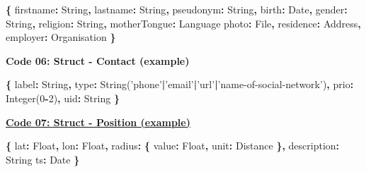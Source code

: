 \documentclass[12pt,english,a4paper,titlepage,cleardoublepage=empty,dottedtoc]{report}
\newenvironment{Shaded}{\begin{snugshade}}{\end{snugshade}}
\newcommand{\DataTypeTok}[1]{\textcolor[rgb]{0.13,0.29,0.53}{#1}}
\newcommand{\DecValTok}[1]{\textcolor[rgb]{0.00,0.00,0.81}{#1}}
\newcommand{\StringTok}[1]{\textcolor[rgb]{0.31,0.60,0.02}{#1}}
\newcommand{\OperatorTok}[1]{\textcolor[rgb]{0.81,0.36,0.00}{\textbf{#1}}}
\newcommand{\AttributeTok}[1]{\textcolor[rgb]{0.77,0.63,0.00}{#1}}
\newcommand{\NormalTok}[1]{#1}
\begin{document}
\begin{Shaded}
\begin{Highlighting}[numbers=left,,]
\OperatorTok{\{}
    \DataTypeTok{firstname}\OperatorTok{:}\NormalTok{ String}\OperatorTok{,}
    \DataTypeTok{lastname}\OperatorTok{:}\NormalTok{ String}\OperatorTok{,}
    \DataTypeTok{pseudonym}\OperatorTok{:}\NormalTok{ String}\OperatorTok{,}
    \DataTypeTok{birth}\OperatorTok{:}\NormalTok{ Date}\OperatorTok{,}
    \DataTypeTok{gender}\OperatorTok{:}\NormalTok{ String}\OperatorTok{,}
    \DataTypeTok{religion}\OperatorTok{:}\NormalTok{ String}\OperatorTok{,}
    \DataTypeTok{motherTongue}\OperatorTok{:}\NormalTok{ Language}
    \DataTypeTok{photo}\OperatorTok{:}\NormalTok{ File}\OperatorTok{,}
    \DataTypeTok{residence}\OperatorTok{:}\NormalTok{ Address}\OperatorTok{,}
    \DataTypeTok{employer}\OperatorTok{:}\NormalTok{ Organisation}
\OperatorTok{\}}
\end{Highlighting}
\end{Shaded}

\textbf{\protect\hypertarget{code-06_struct_contact}{}{Code 06: Struct -
Contact (example)}}

\begin{Shaded}
\begin{Highlighting}[numbers=left,,]
\OperatorTok{\{}
    \DataTypeTok{label}\OperatorTok{:}\NormalTok{ String}\OperatorTok{,}
    \DataTypeTok{type}\OperatorTok{:} \AttributeTok{String}\NormalTok{(}\StringTok{'phone'}\OperatorTok{|}\StringTok{'email'}\OperatorTok{|}\StringTok{'url'}\OperatorTok{|}\StringTok{'name-of-social-network'}\NormalTok{)}\OperatorTok{,}
    \DataTypeTok{prio}\OperatorTok{:} \AttributeTok{Integer}\NormalTok{(}\DecValTok{0}\OperatorTok{-}\DecValTok{2}\NormalTok{)}\OperatorTok{,}
    \DataTypeTok{uid}\OperatorTok{:}\NormalTok{ String}
\OperatorTok{\}}
\end{Highlighting}
\end{Shaded}

\textbf{\protect\hyperlink{code-07_struct_position}{Code 07: Struct -
Position (example)}}

\begin{Shaded}
\begin{Highlighting}[numbers=left,,]
\OperatorTok{\{}
    \DataTypeTok{lat}\OperatorTok{:}\NormalTok{ Float}\OperatorTok{,}
    \DataTypeTok{lon}\OperatorTok{:}\NormalTok{ Float}\OperatorTok{,}
    \DataTypeTok{radius}\OperatorTok{:} \OperatorTok{\{}
        \DataTypeTok{value}\OperatorTok{:}\NormalTok{ Float}\OperatorTok{,}
        \DataTypeTok{unit}\OperatorTok{:}\NormalTok{ Distance}
    \OperatorTok{\},}
    \DataTypeTok{description}\OperatorTok{:}\NormalTok{ String}
    \DataTypeTok{ts}\OperatorTok{:}\NormalTok{ Date}
\OperatorTok{\}}
\end{Highlighting}
\end{Shaded}
\end{document}
